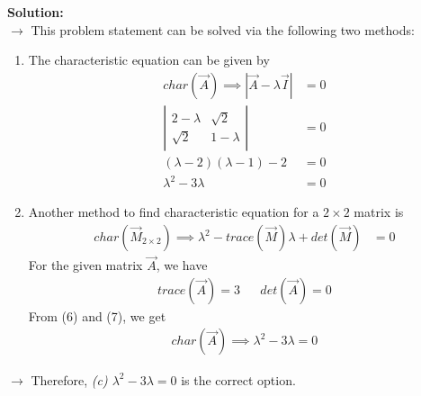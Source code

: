 \documentclass[journal]{IEEEtran}
\begin{document}
\textbf{Solution:}\\
$\longrightarrow$ This problem statement can be solved via the following two methods:
\begin{enumerate}[label=\arabic*)]
    \item {
    The characteristic equation can be given by
    \begin{align}
        char(\vec{A}) \implies |\vec{A}-\lambda\vec{I}| &= 0 \\
        \left|\begin{array}{cc}2-\lambda&\sqrt{2}\\ \sqrt{2}&1-\lambda\end{array}\right| &= 0 \\
        (\lambda-2)(\lambda-1)-2 &= 0 \\
        \lambda^2-3\lambda &= 0
    \end{align}
    }
    \item {
    Another method to find characteristic equation for a $2\times2$ matrix is
    \begin{align}
        char(\vec{M}_{2\times2}) \implies \lambda^2-trace(\vec{M})\lambda+det(\vec{M}) &= 0
    \end{align}
    For the given matrix $\vec{A}$, we have
    \begin{align} trace(\vec{A}) = 3 && det(\vec{A}) = 0 \end{align}
    From (6) and (7), we get
    \begin{align}
        char(\vec{A}) \implies \lambda^2-3\lambda = 0
    \end{align}
    }
\end{enumerate}
$\longrightarrow$ Therefore, \textit{(c) $\lambda^2-3\lambda=0$} is the correct option.
\end{document}
